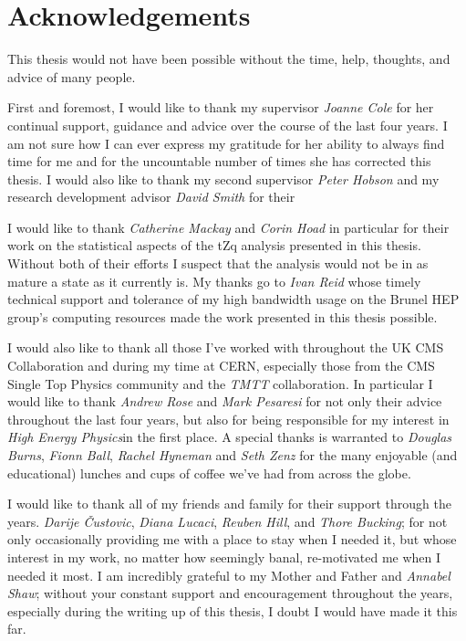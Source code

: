 \documentclass[11pt,a4paper]{report}
\begin{document}
\clearpage
\newpage

\chapter*{Acknowledgements} \label{sec:acknowledgments}
This thesis would not have been possible without the time, help, thoughts, and advice of many people.

First and foremost, I would like to thank my supervisor \textit{Joanne Cole} for her continual support, guidance and advice over the course of the last four years.
I am not sure how I can ever express my gratitude for her ability to always find time for me and for the uncountable number of times she has corrected this thesis.
I would also like to thank my second supervisor \emph{Peter Hobson} and my research development advisor \emph{David Smith} for their 

I would like to thank \textit{Catherine Mackay} and \textit{Corin Hoad} in particular for their work on the statistical aspects of the tZq analysis presented in this thesis.
Without both of their efforts I suspect that the analysis would not be in as mature a state as it currently is.
My thanks go to \textit{Ivan Reid} whose timely technical support and tolerance of my high bandwidth usage on the Brunel HEP group's computing resources made the work presented in this thesis possible.

I would also like to thank all those I've worked with throughout the UK CMS Collaboration and during my time at CERN, especially those from the CMS Single Top Physics community and the \emph{TMTT} collaboration.
In particular I would like to thank \textit{Andrew Rose} and \textit{Mark Pesaresi} for not only their advice throughout the last four years, but also for being responsible for my interest in \emph{High Energy Physics}in the first place.
A special thanks is warranted to  \textit{Douglas Burns}, \textit{Fionn Ball}, \textit{Rachel Hyneman} and \textit{Seth Zenz} for the many enjoyable (and educational) lunches and cups of coffee we've had from across the globe.

I would like to thank all of my friends and family for their support through the years.
\textit{Darije \v{C}ustovi{c}}, \textit{Diana Lucaci}, \textit{Reuben Hill}, and \textit{Thore Bucking}; for not only occasionally providing me with a place to stay when I needed it, but whose interest in my work, no matter how seemingly banal, re-motivated me when I needed it most.
I am incredibly grateful to my Mother and Father and \textit{Annabel Shaw}; without your constant support and encouragement throughout the years, especially during the writing up of this thesis, I doubt I would have made it this far.
\end{document}

